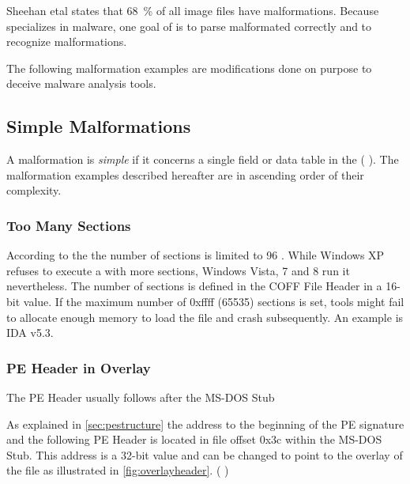 Sheehan et\thinspace{}al states that 68~\% of all image files have malformations. \cite[slide 7]{sheehan07}
Because \portex{} specializes in \PE{} malware, one goal of \portex{} is to parse malformated  correctly and to recognize malformations.


The following malformation examples are modifications done on purpose to deceive malware analysis tools.

\subsection{Simple Malformations}

A malformation is \emph{simple} if it concerns a single field or data table in the \PE{} (\cf{} \cite[slide 7]{vuksan11}).
The malformation examples described hereafter are in ascending order of their complexity. 

\subsubsection*{Too Many Sections}

According to the \PECOFF{} the number of sections is limited to 96 \cite[]{pespec}. While Windows XP refuses to execute a \PE{} with more sections, Windows Vista, 7 and 8 run it nevertheless. The number of sections is defined in the COFF File Header in a 16-bit value. If the maximum number of 0xffff (65535) sections is set, tools might fail to allocate enough memory to load the file and crash subsequently. An example is IDA v5.3.

\subsubsection*{PE Header in Overlay}

The PE Header usually follows after the MS-DOS Stub 

As explained in \autoref{sec:pestructure} the address to the beginning of the PE signature and the following PE Header is located in file offset 0x3c within the MS-DOS Stub. This address is a 32-bit value and can be changed to point to the overlay of the file as illustrated in \autoref{fig:overlayheader}. (\cf{} \cite[slide 13]{vuksan11})

